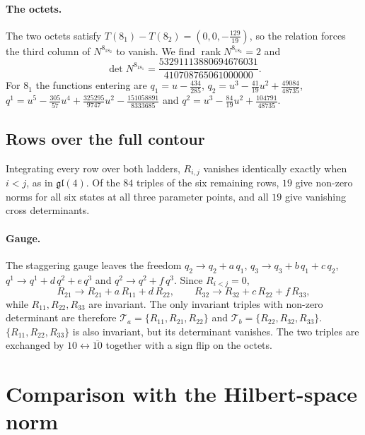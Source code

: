 \documentclass[11pt]{article}
\newcommand{\gl}{\mathfrak{gl}}
\begin{document}
\paragraph{The octets.} The two octets satisfy $T(8_1)-T(8_2)=(0,0,-\tfrac{129}{19})$, so the relation
forces the third column of $N^{8_18_2}$ to vanish. We find $\operatorname{rank}N^{8_18_2}=2$ and
\begin{equation}
\det N^{8_18_1}=\frac{53291113880694676031}{410708765061000000}.
\end{equation}
For $8_1$ the functions entering are $q_1=u-\tfrac{434}{285}$,
$q_2=u^3-\tfrac{41}{19}u^2+\tfrac{49084}{48735}$,
$q^1=u^5-\tfrac{305}{57}u^4+\tfrac{325295}{9747}u^2-\tfrac{151058891}{8333685}$ and
$q^2=u^3-\tfrac{84}{19}u^2+\tfrac{104791}{48735}$.

\subsection{Rows over the full contour}
Integrating every row over both ladders, $R_{i,j}$ vanishes identically exactly when $i<j$, as in
$\gl(4)$. Of the $84$ triples of the six remaining rows, $19$ give non-zero norms for all six
states at all three parameter points, and all $19$ give vanishing cross determinants.

\paragraph{Gauge.} The staggering gauge leaves the freedom $q_2\to q_2+a\,q_1$,
$q_3\to q_3+b\,q_1+c\,q_2$, $q^1\to q^1+d\,q^2+e\,q^3$ and $q^2\to q^2+f\,q^3$. Since $R_{i<j}=0$,
\begin{equation}
R_{21}\to R_{21}+a\,R_{11}+d\,R_{22},\qquad R_{32}\to R_{32}+c\,R_{22}+f\,R_{33},
\end{equation}
while $R_{11},R_{22},R_{33}$ are invariant. The only invariant triples with non-zero determinant are
therefore $\mathcal T_a=\{R_{11},R_{21},R_{22}\}$ and $\mathcal T_b=\{R_{22},R_{32},R_{33}\}$.
$\{R_{11},R_{22},R_{33}\}$ is also invariant, but its determinant vanishes. The two triples are
exchanged by $10\leftrightarrow\overline{10}$ together with a sign flip on the octets.

\section{Comparison with the Hilbert-space norm}
\end{document}
